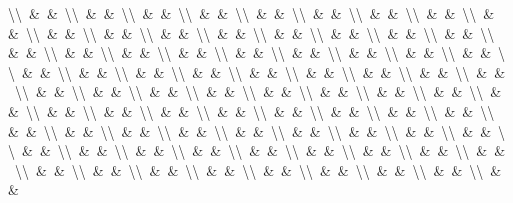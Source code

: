 \documentclass[
  ukrainian,
]{article}
\begin{document}
\textbackslash{}\textbackslash{}\ \&\ \&\ \textbackslash{}\textbackslash{}\ \&\ \&\ \textbackslash{}\textbackslash{}\ \&\ \&\ \textbackslash{}\textbackslash{}\ \&\ \&\ \textbackslash{}\textbackslash{}\ \&\ \&\ \textbackslash{}\textbackslash{}\ \&\ \&\ \textbackslash{}\textbackslash{}\ \&\ \&\ \textbackslash{}\textbackslash{}\ \&\ \&\ \textbackslash{}\textbackslash{}\ \&\ \&\ \textbackslash{}\textbackslash{}\ \&\ \&\ \textbackslash{}\textbackslash{}\ \&\ \&\ \textbackslash{}\textbackslash{}\ \&\ \&\ \textbackslash{}\textbackslash{}\ \&\ \&\ \textbackslash{}\textbackslash{}\ \&\ \&\ \textbackslash{}\textbackslash{}\ \&\ \&\ \textbackslash{}\textbackslash{}\ \&\ \&\ \textbackslash{}\textbackslash{}\ \&\ \&\ \textbackslash{}\textbackslash{}\ \&\ \&\ \textbackslash{}\textbackslash{}\ \&\ \&\ \textbackslash{}\textbackslash{}\ \&\ \&\ \textbackslash{}\textbackslash{}\ \&\ \&\ \textbackslash{}\textbackslash{}\ \&\ \&\ \textbackslash{}\textbackslash{}\ \&\ \&\ \textbackslash{}\textbackslash{}\ \&\ \&\ \textbackslash{}\textbackslash{}\ \&\ \&\ \textbackslash{}\textbackslash{}\ \&\ \&\ \textbackslash{}\textbackslash{}\ \&\ \&\ \textbackslash{}\textbackslash{}\ \&\ \&\ \textbackslash{}\textbackslash{}\ \&\ \&\ \textbackslash{}\textbackslash{}\ \&\ \&\ \textbackslash{}\textbackslash{}\ \&\ \&\ \textbackslash{}\textbackslash{}\ \&\ \&\ \textbackslash{}\textbackslash{}\ \&\ \&\ \textbackslash{}\textbackslash{}\ \&\ \&\ \textbackslash{}\textbackslash{}\ \&\ \&\ \textbackslash{}\textbackslash{}\ \&\ \&\ \textbackslash{}\textbackslash{}\ \&\ \&\ \textbackslash{}\textbackslash{}\ \&\ \&\ \textbackslash{}\textbackslash{}\ \&\ \&\ \textbackslash{}\textbackslash{}\ \&\ \&\ \textbackslash{}\textbackslash{}\ \&\ \&\ \textbackslash{}\textbackslash{}\ \&\ \&\ \textbackslash{}\textbackslash{}\ \&\ \&\ \textbackslash{}\textbackslash{}\ \&\ \&\ \textbackslash{}\textbackslash{}\ \&\ \&\ \textbackslash{}\textbackslash{}\ \&\ \&\ \textbackslash{}\textbackslash{}\ \&\ \&\ \textbackslash{}\textbackslash{}\ \&\ \&\ \textbackslash{}\textbackslash{}\ \&\ \&\ \textbackslash{}\textbackslash{}\ \&\ \&\ \textbackslash{}\textbackslash{}\ \&\ \&\ \textbackslash{}\textbackslash{}\ \&\ \&\ \textbackslash{}\textbackslash{}\ \&\ \&\ \textbackslash{}\textbackslash{}\ \&\ \&\ \textbackslash{}\textbackslash{}\ \&\ \&\ \textbackslash{}\textbackslash{}\ \&\ \&\ \textbackslash{}\textbackslash{}\ \&\ \&\ \textbackslash{}\textbackslash{}\ \&\ \&\ \textbackslash{}\textbackslash{}\ \&\ \&\ \textbackslash{}\textbackslash{}\ \&\ \&\ \textbackslash{}\textbackslash{}\ \&\ \&\ \textbackslash{}\textbackslash{}\ \&\ \&\ \textbackslash{}\textbackslash{}\ \&\ \&\ \textbackslash{}\textbackslash{}\ \&\ \&\ \textbackslash{}\textbackslash{}\ \&\ \&\ \textbackslash{}\textbackslash{}\ \&\ \&\ \textbackslash{}\textbackslash{}\ \&\ \&\ \textbackslash{}\textbackslash{}\ \&\ \&\ \textbackslash{}\textbackslash{}\ \&\ \&\ \textbackslash{}\textbackslash{}\ \&\ \&\ \textbackslash{}\textbackslash{}\ \&\ \&\ \textbackslash{}\textbackslash{}\ \&\ \&\ \textbackslash{}\textbackslash{}\ \&\ \&\ \textbackslash{}\textbackslash{}\ \&\ \&\ \textbackslash{}\textbackslash{}\ \&\ \&\ \textbackslash{}\textbackslash{}\ \&\ \&\ \textbackslash{}\textbackslash{}\ \&\ \&\ \textbackslash{}\textbackslash{}\ \&\ \&\ \textbackslash{}\textbackslash{}\ \&\ \&\ 
\end{document}
